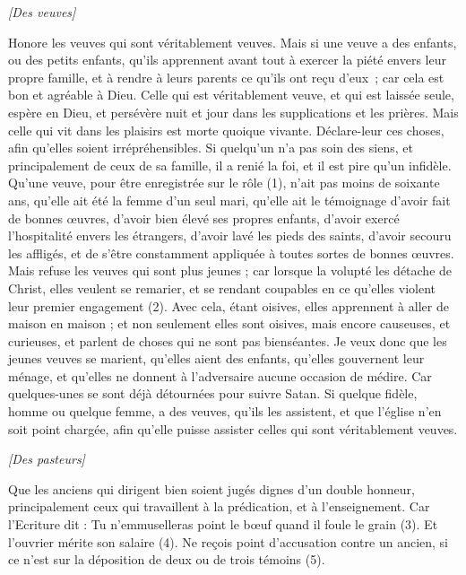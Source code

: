 \begin{multicols}{2}
\begin{center}
\textit{[Des veuves]}
\end{center}
\PPE{}
Honore les veuves qui sont véritablement veuves.
Mais si une veuve a des enfants, ou des petits enfants, qu'ils apprennent avant tout à exercer la piété envers leur propre famille, et à rendre à leurs parents ce qu’ils ont reçu d’eux ; car cela est bon et agréable à Dieu.
Celle qui est véritablement veuve, et qui est laissée seule, espère en Dieu, et persévère nuit et jour dans les supplications et les prières.
Mais celle qui vit dans les plaisirs est morte quoique vivante.
Déclare-leur ces choses, afin qu'elles soient irrépréhensibles.
Si quelqu'un n'a pas soin des siens, et principalement de ceux de sa famille, il a renié la foi, et il est pire qu'un infidèle.
Qu’une veuve, pour être enregistrée sur le rôle (1), n’ait pas moins de soixante ans, qu’elle ait été la femme d’un seul mari,
qu’elle ait le témoignage d'avoir fait de bonnes œuvres, d'avoir bien élevé ses propres enfants, d'avoir exercé l’hospitalité envers les étrangers, d'avoir lavé les pieds des saints, d'avoir secouru les affligés, et de s'être constamment appliquée à toutes sortes de bonnes œuvres.
Mais refuse les veuves qui sont plus jeunes ; car lorsque la volupté les détache de Christ, elles veulent se remarier,
et se rendant coupables en ce qu’elles violent leur premier engagement (2).
Avec cela, étant oisives, elles apprennent à aller de maison en maison ; et non seulement elles sont oisives, mais encore causeuses, et curieuses, et parlent de choses qui ne sont pas bienséantes.
Je veux donc que les jeunes veuves se marient, qu'elles aient des enfants, qu'elles gouvernent leur ménage, et qu'elles ne donnent à l'adversaire aucune occasion de médire.
Car quelques-unes se sont déjà détournées pour suivre Satan.
Si quelque fidèle, homme ou quelque femme, a des veuves, qu'ils les assistent, et que l'église n'en soit point chargée, afin qu’elle puisse assister celles qui sont véritablement veuves.
\begin{center}
\textit{[Des pasteurs]}
\end{center}
\PPE{}
Que les anciens qui dirigent bien soient jugés dignes d'un double honneur, principalement ceux qui travaillent à la prédication, et à l’enseignement.
Car l’Ecriture dit : Tu n’emmuselleras point le bœuf quand il foule le grain (3). Et l'ouvrier mérite son salaire (4).
Ne reçois point d'accusation contre un ancien, si ce n’est sur la déposition de deux ou de trois témoins (5).

\end{multicols}
